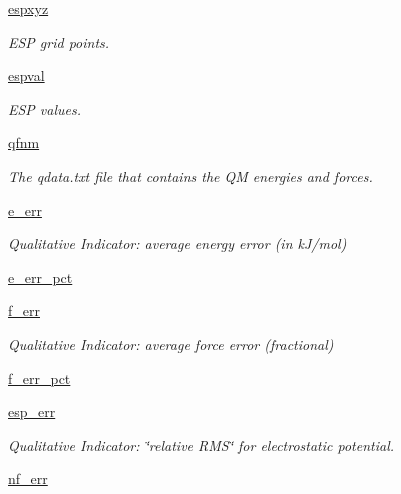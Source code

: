 \begin{DoxyCompactItemize}
\hyperlink{classsrc_1_1abinitio_1_1AbInitio_a35c72bc60a4e4678c0d513f7a04535ee}{espxyz}
\begin{DoxyCompactList}\small\item\em E\+SP grid points. \end{DoxyCompactList}\item 
\hyperlink{classsrc_1_1abinitio_1_1AbInitio_a907086906ad0726918a5888bb5f6a382}{espval}
\begin{DoxyCompactList}\small\item\em E\+SP values. \end{DoxyCompactList}\item 
\hyperlink{classsrc_1_1abinitio_1_1AbInitio_a0ba71e502a5c605a6823000429189bcb}{qfnm}
\begin{DoxyCompactList}\small\item\em The qdata.\+txt file that contains the QM energies and forces. \end{DoxyCompactList}\item 
\hyperlink{classsrc_1_1abinitio_1_1AbInitio_a184c5a163d4e359f3f2b8d1788d11c16}{e\+\_\+err}
\begin{DoxyCompactList}\small\item\em Qualitative Indicator\+: average energy error (in k\+J/mol) \end{DoxyCompactList}\item 
\hyperlink{classsrc_1_1abinitio_1_1AbInitio_a39e033f3b54c689eed565afab4f0909b}{e\+\_\+err\+\_\+pct}
\item 
\hyperlink{classsrc_1_1abinitio_1_1AbInitio_ab0477deb7a9e68913b808d173d095931}{f\+\_\+err}
\begin{DoxyCompactList}\small\item\em Qualitative Indicator\+: average force error (fractional) \end{DoxyCompactList}\item 
\hyperlink{classsrc_1_1abinitio_1_1AbInitio_a245a174a32cecbb1c28a71c2a7080880}{f\+\_\+err\+\_\+pct}
\item 
\hyperlink{classsrc_1_1abinitio_1_1AbInitio_a083d6a86d0c4c3e81d7aa1f5e1985b94}{esp\+\_\+err}
\begin{DoxyCompactList}\small\item\em Qualitative Indicator\+: \char`\"{}relative R\+M\+S\char`\"{} for electrostatic potential. \end{DoxyCompactList}\item 
\hyperlink{classsrc_1_1abinitio_1_1AbInitio_af5bff4b475e1c30aa9ae65ba10d0bf23}{nf\+\_\+err}
\item 

\end{DoxyCompactItemize}
